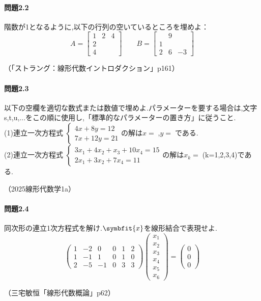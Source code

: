 \paragraph{問題2.2}
階数が1となるように,以下の行列の空いているところを埋めよ：
\[
A=
\begin{bmatrix}
    1 & 2 & 4 \\
    2 & & \\
    4 & & 
\end{bmatrix} \qquad
B=
\begin{bmatrix}
    & 9 &  \\
    1 & & \\
    2 & 6 & -3
\end{bmatrix}
\]
\begin{flushright}
    （「ストラング：線形代数イントロダクション」p161）
\end{flushright}
\paragraph{問題2.3}
以下の空欄を適切な数式または数値で埋めよ.パラメーターを要する場合は,文字s,t,u,...をこの順に使用し,「標準的なパラメーターの置き方」に従うこと.\\
(1)連立一次方程式
$\begin{cases*}
    4x+8y=12\\
    7x+12y=21
\end{cases*}$の解は$x=\;$\;,$y=\;$\;である.\\
(2)連立一次方程式
$\begin{cases*}
    3x_1+4x_2+x_3+10x_4=15 \\
    2x_1+3x_2+7x_4=11
\end{cases*}$の解は$x_k=\;$\;(k=1,2,3,4)である.
\begin{flushright}
    （2025線形代数学1a）
\end{flushright}
\paragraph{問題2.4}
同次形の連立1次方程式を解け.$\symbfit{x}$を線形結合で表現せよ.\\
\[\begin{pmatrix}
    1 & -2 & 0 & 0 & 1 & 2 \\
    1 & -1 & 1 & 0 & 1 & 0 \\
    2 & -5 & -1 & 0 & 3 & 3 
\end{pmatrix}
\begin{pmatrix}
    x_1 \\ x_2 \\ x_3 \\ x_4 \\ x_5 \\ x_6 
\end{pmatrix}=
\begin{pmatrix}
    0 \\ 0 \\ 0
\end{pmatrix}\]
\begin{flushright}
    （三宅敏恒「線形代数概論」p62）
\end{flushright}
